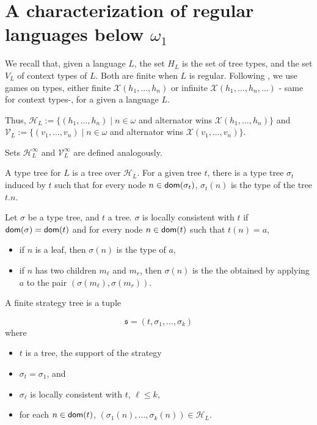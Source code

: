 \section{A characterization of regular languages  below $\omega_1$}

We recall that, given a language $L$, the set $H_L$ is the set of tree types, and the set $V_L$ of context types of $L$. Both are finite when $L$ is regular. Following \cite{bp}, we use  games on types, either finite $\mathcal{X}(h_1, \dots, h_n)$ or infinite $\mathcal{X}(h_1, \dots, h_n, \dots)$ - same for context types-, for a given a language $L$.



Thus, 
$\mathcal{H}_L:= \{(h_1, \dots, h_n) 
\mid 
n \in \omega 
$
and alternator wins $\mathcal{X}(h_1, \dots, h_n)\}$
and 
$\mathcal{V}_L:= \{(v_1, \dots, v_n) \mid n \in \omega 
$
and alternator wins $\mathcal{X}(v_1, \dots, v_n)\}$.

Sets 
$\mathcal{H}^\infty_L$ and $\mathcal{V}^\infty_L$ are defined analogously.




A type tree for $L$ is a tree over $\mathcal{H}_L$. For a given tree $t$, there is a type tree $\sigma_t$ induced by $t$ such that for every node $n \in \mathsf{dom}(\sigma_t)$, $\sigma_t(n)$ is the type of the tree $t.n$.

Let $\sigma$ be a type tree, and $t$ a tree. $\sigma$ is locally consistent with $t$ if $\mathsf{dom}(\sigma)=\mathsf{dom}(t)$ and for every node $n \in \mathsf{dom}(t)$ such that $t(n)=a$, 
\begin{itemize}
\item if $n$ is a leaf, then $\sigma(n)$ is the type of $a$,
\item if $n$ has two children $m_\ell$ and $m_r$, then $\sigma(n)$ is the the obtained by applying $a$ to the pair $(\sigma(m_\ell), \sigma(m_r))$.
\end{itemize}

A finite strategy tree is a tuple

\[ \mathfrak{s}=(t, \sigma_1, \dots, \sigma_k) \] where
\begin{itemize}
\item $t$ is a tree, the support of the strategy
\item $\sigma_t=\sigma_1$, and
\item $\sigma_\ell$ is locally consistent with $t$, $\ell \leq k$,
\item for each $n \in \mathsf{dom}(t)$, $(\sigma_1(n), \dots, \sigma_k(n)) \in \mathcal{H}_L$.
\end{itemize}

